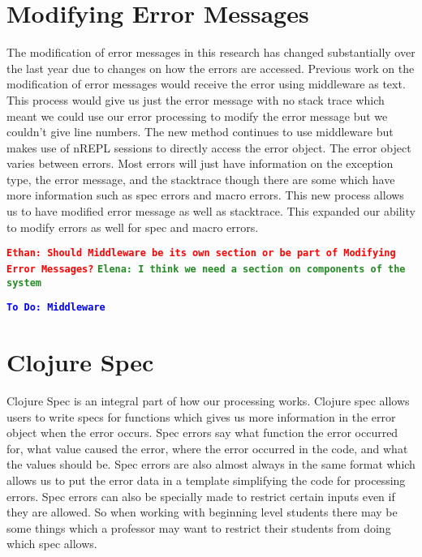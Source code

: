 \documentclass[12pt]{article}
\newcommand{\comment}[1]{{\bf \tt  {#1}}}
\newcommand{\emcomment}[1]{\textcolor{ForestGreen}{\comment{Elena: {#1}}}}
\newcommand{\eucomment}[1]{\textcolor{red}{\comment{Ethan: {#1}}}}
\newcommand{\todo}[1]{\textcolor{blue}{\comment{To Do: {#1}}}}
\begin{document}
\section{Modifying Error Messages}
The modification of error messages in this research has changed substantially over the last year due to changes on how the errors are accessed. 
Previous work on the modification of error messages would receive the error using middleware as text.
This process would give us just the error message with no stack trace which meant we could use our error processing to modify the error message but we couldn't give line numbers.
The new method continues to use middleware but makes use of nREPL sessions to directly access the error object.
The error object varies between errors. 
Most errors will just have information on the exception type, the error message, and the stacktrace though there are some which have more information such as spec errors and macro errors.
This new process allows us to have modified error message as well as stacktrace.
This expanded our ability to modify errors as well for spec and macro errors.

\eucomment{Should Middleware be its own section or be part of Modifying Error Messages?}
\emcomment{I think we need a section on components of the system}

\todo{Middleware}


\section{Clojure Spec}
Clojure Spec is an integral part of how our processing works. 
Clojure spec allows users to write specs for functions which gives us more information in the error object when the error occurs. 
Spec errors say what function the error occurred for, what value caused the error, where the error occurred in the code, and what the values should be. 
Spec errors are also almost always in the same format which allows us to put the error data in a template simplifying the code for processing errors. 
Spec errors can also be specially made to restrict certain inputs even if they are allowed. 
So when working with beginning level students there may be some things which a professor may want to restrict their students from doing which spec allows.
\end{document}

